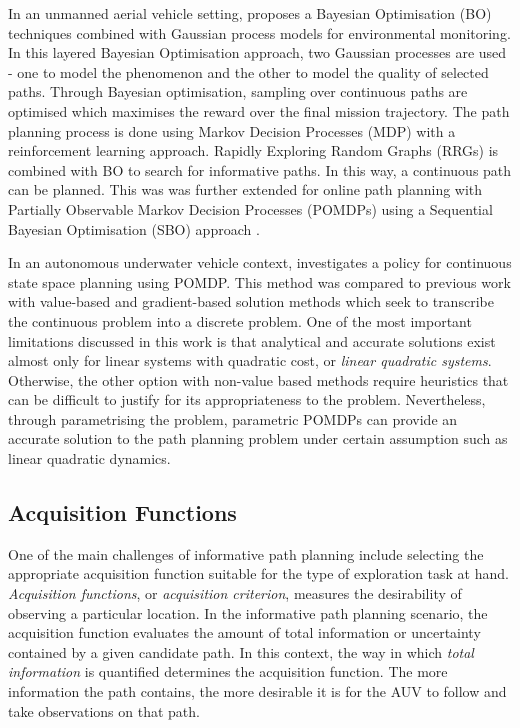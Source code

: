 			In an unmanned aerial vehicle setting, \cite{Roman:BayesianOptimisation} proposes a Bayesian Optimisation (BO) techniques combined with Gaussian process models for environmental monitoring. In this layered Bayesian Optimisation approach, two Gaussian processes are used - one to model the phenomenon and the other to model the quality of selected paths. Through Bayesian optimisation, sampling over continuous paths are optimised which maximises the reward over the final mission trajectory. The path planning process is done using Markov Decision Processes (MDP) with a reinforcement learning approach. Rapidly Exploring Random Graphs (RRGs) is combined with BO to search for informative paths. In this way, a continuous path can be planned. This was was further extended for online path planning with Partially Observable Markov Decision Processes (POMDPs) using a Sequential Bayesian Optimisation (SBO) approach \citep{Roman:SequentialBayesianOptimisation}.
			
			In an autonomous underwater vehicle context, \cite{ParametricPOMDP} investigates a policy for continuous state space planning using POMDP. This method was compared to previous work with value-based and gradient-based solution methods which seek to transcribe the continuous problem into a discrete problem. One of the most important limitations discussed in this work is that analytical and accurate solutions exist almost only for linear systems with quadratic cost, or \textit{linear quadratic systems}. Otherwise, the other option with non-value based methods require heuristics that can be difficult to justify for its appropriateness to the problem. Nevertheless, through parametrising the problem, parametric POMDPs can provide an accurate solution to the path planning problem under certain assumption such as linear quadratic dynamics.
		
		\subsection{Acquisition Functions}
		\label{Background:RelatedWork:AcquisitoinFunctions}
		
			One of the main challenges of informative path planning include selecting the appropriate acquisition function suitable for the type of exploration task at hand. \textit{Acquisition functions}, or \textit{acquisition criterion}, measures the desirability of observing a particular location. In the informative path planning scenario, the acquisition function evaluates the amount of total information or uncertainty contained by a given candidate path. In this context, the way in which \textit{total information} is quantified determines the acquisition function. The more information the path contains, the more desirable it is for the AUV to follow and take observations on that path. 
	
